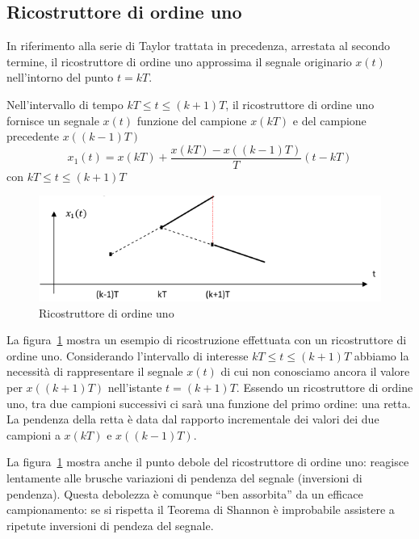 \documentclass[a4paper]{report}
\begin{document}
\subsection{Ricostruttore di ordine uno}
In riferimento alla serie di Taylor trattata in precedenza, arrestata
al secondo termine, il ricostruttore di ordine uno approssima il
segnale originario $x(t)$ nell'intorno del punto $t = kT$.

Nell'intervallo di tempo $kT \leq t \leq (k + 1)T$, il ricostruttore
di ordine uno fornisce un segnale $x(t)$ funzione del campione $x(kT)$
e del campione precedente $x((k - 1)T)$
\begin{equation}\label{eq:ricostruttoreOrdineUno}
  x_1(t) = x(kT) + \dfrac{x(kT) - x((k - 1)T)}{T}(t - kT)
\end{equation}
con $kT \leq t \leq (k + 1)T$
\begin{figure}[!h]
  \begin{center}
    \includegraphics[scale=0.5]{./figures/ricostruttoreOrdineUno00.png}
    \caption{Ricostruttore di ordine uno}\label{fig:ricostruttoreOrdineUno00}
  \end{center}
\end{figure}
La figura~\ref{fig:ricostruttoreOrdineUno00} mostra un esempio di
ricostruzione effettuata con un ricostruttore di ordine
uno. Considerando l'intervallo di interesse  $kT \leq t \leq (k + 1)T$
abbiamo la necessit\`a di rappresentare il segnale $x(t)$ di cui non
conosciamo ancora il valore per $x((k + 1)T)$ nell'istante $t = (k +
1)T$. Essendo un ricostruttore di ordine uno, tra due campioni
successivi ci sar\`a una funzione del primo ordine: una retta. La
pendenza della retta \`e data dal rapporto incrementale dei valori dei
due campioni a $x(kT)$ e $x((k - 1)T)$.

La figura~\ref{fig:ricostruttoreOrdineUno00} mostra anche il punto
debole del ricostruttore di ordine uno: reagisce lentamente alle brusche
variazioni di pendenza del segnale (inversioni di pendenza). Questa
debolezza \`e comunque ``ben assorbita'' da un efficace campionamento:
se si rispetta il Teorema di Shannon \`e improbabile assistere a
ripetute inversioni di pendeza del segnale.
\end{document}
